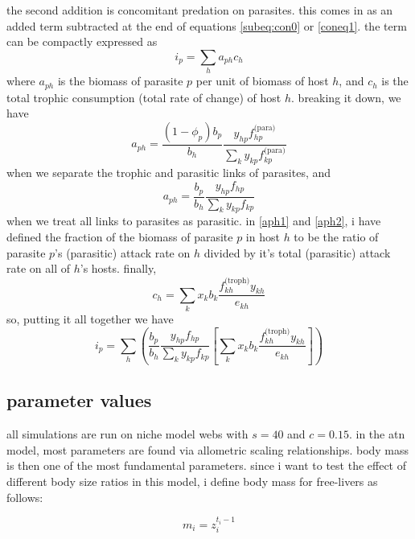 \documentclass[11pt]{amsart}
\begin{document}
the second addition is concomitant predation on parasites.  this comes in as an added term subtracted at the end of equations \eqref{subeq:con0} or \eqref{coneq1}.  the term can be compactly expressed as 
\begin{equation}
i_p = \sum_ha_{ph}c_h \label{ip1}
\end{equation}
where $a_{ph}$ is the biomass of parasite $p$ per unit of biomass of host $h$, and $c_h$ is the total trophic consumption (total rate of change) of host $h$.  breaking it down, we have
\begin{equation}
a_{ph} = \frac{(1-\phi_p)b_p}{b_h}\frac{y_{hp}f^\text{(para)}_{hp}}{\sum_{k}y_{kp}f^\text{(para)}_{kp}} \label{aph1}
\end{equation}
when we separate the trophic and parasitic links of parasites, and
\begin{equation}
a_{ph} = \frac{b_p}{b_h}\frac{y_{hp}f_{hp}}{\sum_{k}y_{kp}f_{kp}} \label{aph2}
\end{equation}
when we treat all links to parasites as parasitic.  in \eqref{aph1} and \eqref{aph2}, i have defined the fraction of the biomass of parasite $p$ in host $h$ to be the ratio of parasite $p$'s (parasitic) attack rate on $h$ divided by it's total (parasitic) attack rate on all of $h$'s hosts.  finally,
\begin{equation}
c_h = \sum_kx_kb_k\frac{f^\text{(troph)}_{kh}y_{kh}}{e_{kh}} \label{cpheq}
\end{equation}
so, putting it all together we have
\begin{equation}
i_p = \sum_h \left(\frac{b_p}{b_h}\frac{y_{hp}f_{hp}}{\sum_{k}y_{kp}f_{kp}}\left[\sum_kx_kb_k\frac{f^\text{(troph)}_{kh}y_{kh}}{e_{kh}}\right] \right) \label{ip2}
\end{equation}

\subsection{parameter values}
all simulations are run on niche model webs with $s = 40$ and $c = 0.15$.  in the atn model, most parameters are found via allometric scaling relationships.  body mass is then one of the most fundamental parameters.  since i want to test the effect of different body size ratios in this model, i define body mass for free-livers as follows:

\begin{equation}
m_i = z_i^{t_i-1} \label{mf}
\end{equation}
\end{document}
